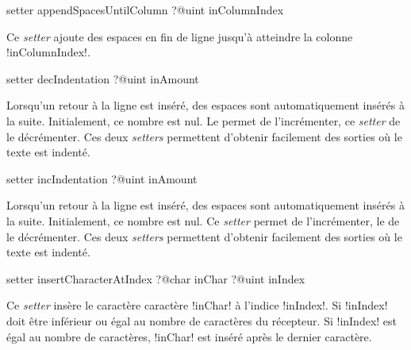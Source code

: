 
\begin{galgasbox}
setter appendSpacesUntilColumn ?@uint inColumnIndex
\end{galgasbox}

Ce \emph{setter} ajoute des espaces en fin de ligne jusqu'à atteindre la colonne \ggs!inColumnIndex!.





\begin{galgasbox}
setter decIndentation ?@uint inAmount
\end{galgasbox}

Lorsqu'un retour à la ligne est inséré, des espaces sont automatiquement insérés à la suite. Initialement, ce nombre est nul. Le  permet de l'incrémenter, ce \emph{setter} de le décrémenter. Ces deux \emph{setters} permettent d'obtenir facilement des sorties où le texte est indenté.






\begin{galgasbox}
setter incIndentation ?@uint inAmount
\end{galgasbox}

Lorsqu'un retour à la ligne est inséré, des espaces sont automatiquement insérés à la suite. Initialement, ce nombre est nul. Ce \emph{setter} permet de l'incrémenter, le  de le décrémenter. Ces deux \emph{setters} permettent d'obtenir facilement des sorties où le texte est indenté.









\begin{galgasbox}
setter insertCharacterAtIndex
   ?@char inChar
   ?@uint inIndex
\end{galgasbox}


Ce \emph{setter} insère le caractère caractère \ggs!inChar! à l'indice \ggs!inIndex!. Si \ggs!inIndex! doit être inférieur ou égal au nombre de caractères du récepteur. Si \ggs!inIndex! est égal au nombre de caractères, \ggs!inChar! est inséré après le dernier caractère. 








